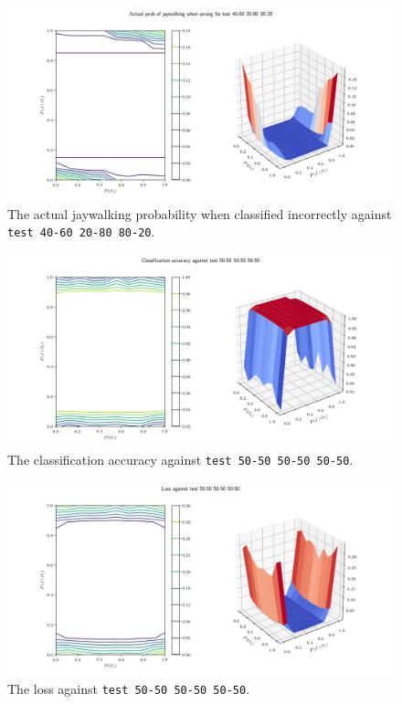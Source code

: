 \documentclass[]{report}
\newcommand{\code}{\texttt}
\begin{document}
\begin{figure}[h]
    \centering
    \centerline{\includegraphics[scale=0.55]{test_40-60_20-80_80-20_jay_prob.png}}
    \caption[]{The actual jaywalking probability when classified incorrectly against \code{test 40-60 20-80 80-20}.}
    \label{fig:test_40-60_20-80_80-20_jay_prob_plot}
\end{figure}

% 
% 

\begin{figure}[h]
    \centering
    \centerline{\includegraphics[scale=0.55]{test_50-50_50-50_50-50_accuracy.png}}
    \caption[]{The classification accuracy against \code{test 50-50 50-50 50-50}.}
    \label{fig:test_50-50_50-50_50-50_accuracy_plot}
\end{figure}

\begin{figure}[h]
    \centering
    \centerline{\includegraphics[scale=0.55]{test_50-50_50-50_50-50_loss.png}}
    \caption[]{The loss against \code{test 50-50 50-50 50-50}.}
    \label{fig:test_50-50_50-50_50-50_loss_plot}
\end{figure}
\end{document}
